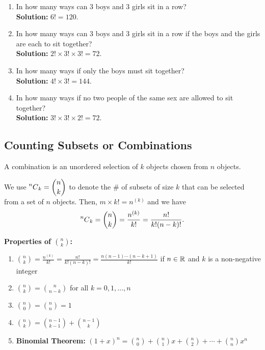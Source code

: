 \begin{example}
    \phantom{}
    \begin{enumerate}[label={(\alph*)}]
        \item In how many ways can 3 boys and 3 girls sit in a row? \\
        \textbf{Solution: } $6! = 120$.
        \item In how many ways can 3 boys and 3 girls sit in a row if the boys and the girls are each to sit together? \\
        \textbf{Solution: } $2! \times 3! \times 3! = 72$.
        \item In how many ways if only the boys must sit together? \\
        \textbf{Solution: } $4! \times 3! = 144$.
        \item In how many ways if no two people of the same sex are allowed to sit together? \\
        \textbf{Solution: } $3! \times 3! \times 2! = 72$.
    \end{enumerate}
    
\end{example}


\subsection{Counting Subsets or Combinations}

\begin{definition}[Combination]
    A combination is an unordered selection of $k$ objects chosen from $n$ objects.
\end{definition}

\begin{remark}
    We use $\displaystyle \prescript{n}{}{C}_{k} = \binom{n}{k}$ to
    denote the \# of subsets of size $k$ that can be selected from a set of $n$ objects.
    Then, $m \times k! = n^{(k)}$ and we have
    \[\prescript{n}{}{C}_{k} = \binom{n}{k} = \frac{n^{(k)}}{k!} = \frac{n!}{k!(n-k)!}.\]
\end{remark}

\textbf{Properties of $\binom{n}{k}$: }
\begin{enumerate}
    \item $\binom{n}{k} = \frac{n^{(k)}}{k!} = \frac{n!}{k!(n-k)!} = \frac{n(n-1)\cdots(n-k+1)}{k!}$ if $n \in {\mathbb{R}}$ and $k$ is a non-negative integer
    \item $\binom{n}{k} = \binom{n}{n-k}$ for all $k = 0, 1, \ldots, n$
    \item $\binom{n}{0} = \binom{n}{n} = 1$
    \item $\binom{n}{k} = \binom{n-1}{k-1} + \binom{n-1}{k}$
    \item \textbf{Binomial Theorem: } $(1 + x)^n = \binom{n}{0} + \binom{n}{1}x + \binom{n}{2} + \cdots + \binom{n}{n}x^n$
\end{enumerate}


